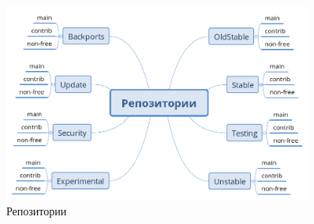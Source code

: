 \documentclass[oneside, final, 14pt]{extreport} %
\begin{document}
\begin{figure}[ht]
    \centering
    \includegraphics[width=0.9\textwidth]{repos.png} %
    \caption{Репозитории}
    \label{fig:repos}
\end{figure}
\end{document}
